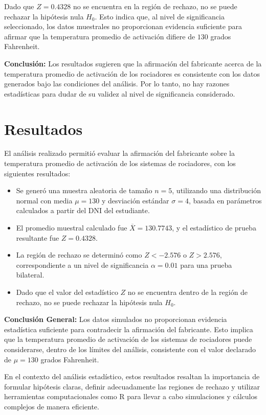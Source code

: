 \documentclass[a4paper,12pt]{article}
\begin{document}
Dado que \( Z = 0.4328 \) no se encuentra en la región de rechazo, no se puede rechazar la hipótesis nula \( H_0 \). Esto indica que, al nivel de significancia seleccionado, los datos muestrales no proporcionan evidencia suficiente para afirmar que la temperatura promedio de activación difiere de \( 130 \) grados Fahrenheit.

\textbf{Conclusión:} Los resultados sugieren que la afirmación del fabricante acerca de la temperatura promedio de activación de los rociadores es consistente con los datos generados bajo las condiciones del análisis. Por lo tanto, no hay razones estadísticas para dudar de su validez al nivel de significancia considerado.


\section{Resultados}

El análisis realizado permitió evaluar la afirmación del fabricante sobre la temperatura promedio de activación de los sistemas de rociadores, con los siguientes resultados:

\begin{itemize}
    \item Se generó una muestra aleatoria de tamaño \( n = 5 \), utilizando una distribución normal con media \( \mu = 130 \) y desviación estándar \( \sigma = 4 \), basada en parámetros calculados a partir del DNI del estudiante.
    \item El promedio muestral calculado fue \( \overline{X} = 130.7743 \), y el estadístico de prueba resultante fue \( Z = 0.4328 \).
    \item La región de rechazo se determinó como \( Z < -2.576 \) o \( Z > 2.576 \), correspondiente a un nivel de significancia \( \alpha = 0.01 \) para una prueba bilateral.
    \item Dado que el valor del estadístico \( Z \) no se encuentra dentro de la región de rechazo, no se puede rechazar la hipótesis nula \( H_0 \).
\end{itemize}

\textbf{Conclusión General:} Los datos simulados no proporcionan evidencia estadística suficiente para contradecir la afirmación del fabricante. Esto implica que la temperatura promedio de activación de los sistemas de rociadores puede considerarse, dentro de los límites del análisis, consistente con el valor declarado de \( \mu = 130 \) grados Fahrenheit.

En el contexto del análisis estadístico, estos resultados resaltan la importancia de formular hipótesis claras, definir adecuadamente las regiones de rechazo y utilizar herramientas computacionales como R para llevar a cabo simulaciones y cálculos complejos de manera eficiente.
\end{document}
